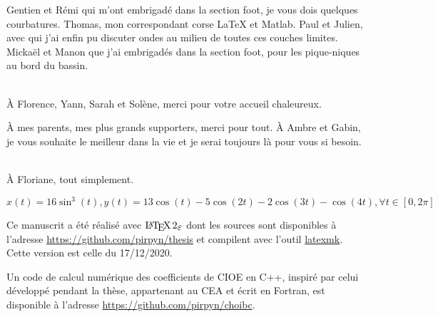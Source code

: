 Gentien et Rémi qui m'ont embrigadé dans la section foot, je vous dois quelques courbatures.
Thomas, mon correspondant corse LaTeX et Matlab.
Paul et Julien, avec qui j'ai enfin pu discuter ondes au milieu de toutes ces couches limites.
Mickaël et Manon que j'ai embrigadés dans la section foot, pour les pique-niques au bord du bassin.

~{}\\

À Florence, Yann, Sarah et Solène, merci pour votre accueil chaleureux.

À mes parents, mes plus grands supporters, merci pour tout. À Ambre et Gabin, je vous souhaite le meilleur dans la vie et je serai toujours là pour vous si besoin.

~{}\\

À Floriane, tout simplement.

\href{https://www.wolframalpha.com/input/?i=parametric+plot+x+\%3D+16+sin\%5E3+t\%2C+y+\%3D+13+cos+t+-+5+cos\%282+t\%29+-+2+cos+\%28+3+t+\%29+-cos\%284t\%29}{\(x(t) = 16 \sin^3(t), y(t) = 13 \cos(t) - 5 \cos(2 t) - 2 \cos ( 3 t ) - \cos(4t), \forall t \in [0,2\pi]\)}


Ce manuscrit a été réalisé avec \(\LaTeXe\) dont les sources sont disponibles à l'adresse \url{https://github.com/pirpyn/thesis} et compilent avec l'outil \href{https://mg.readthedocs.io/latexmk.html}{latexmk}. 
Cette version est celle du 17/12/2020.

Un code de calcul numérique des coefficients de CIOE en C++, inspiré par celui développé pendant la thèse, appartenant au CEA et écrit en Fortran, est disponible à l'adresse \url{https://github.com/pirpyn/choibc}.

